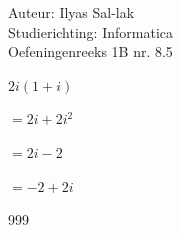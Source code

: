 \documentclass[a4paper]{article}
\begin{document}
\noindent \large Auteur: Ilyas Sal-lak \\
\noindent \large Studierichting: Informatica\\
\noindent \large Oefeningenreeks 1B nr. 8.5\\

\medskip

\normalsize

$2i(1 + i)$

$= 2i + 2i^2 $

$= 2i - 2$

$= -2 + 2i$

\begin{thebibliography}{999}
\end{thebibliography}
\end{document}
